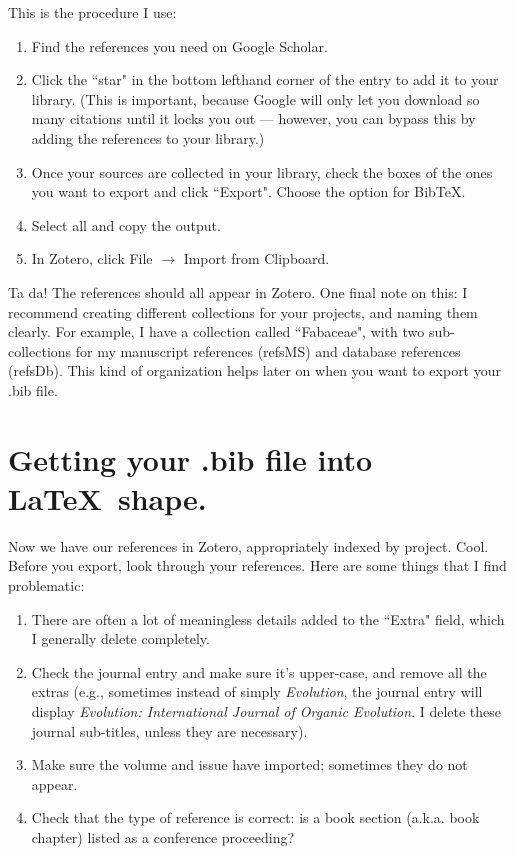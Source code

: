 \documentclass[11pt]{article}
\begin{document}
This is the procedure I use:
\begin{enumerate}
\item{Find the references you need on Google Scholar.}
\item{Click the ``star" in the bottom lefthand corner of the entry to add it to your library. (This is important, because Google will only let you download so many citations until it locks you out --- however, you can bypass this by adding the references to your library.)}
\item{Once your sources are collected in your library, check the boxes of the ones you want to export and click ``Export". Choose the option for Bib\TeX.}
\item{Select all and copy the output.}
\item{In Zotero, click File $\rightarrow$ Import from Clipboard.}
\end{enumerate}

Ta da! The references should all appear in Zotero. One final note on this: I recommend creating different collections for your projects, and naming them clearly. For example, I have a collection called ``Fabaceae", with two sub-collections for my manuscript references (refsMS) and database references (refsDb). This kind of organization helps later on when you want to export your .bib file.\\

\section{Getting your .bib file into \LaTeX\ shape.}

Now we have our references in Zotero, appropriately indexed by project. Cool. Before you export, look through your references. Here are some things that I find problematic:

\begin{enumerate}
\item{There are often a lot of meaningless details added to the ``Extra" field, which I generally delete completely.}
\item{Check the journal entry and make sure it's upper-case, and remove all the extras (e.g., sometimes instead of simply \textit{Evolution}, the journal entry will display \textit{Evolution: International Journal of Organic Evolution}. I delete these journal sub-titles, unless they are necessary).}
\item{Make sure the volume and issue have imported; sometimes they do not appear.}
\item{Check that the type of reference is correct: is a book section (a.k.a. book chapter) listed as a conference proceeding?}
\end{enumerate}
\end{document}
